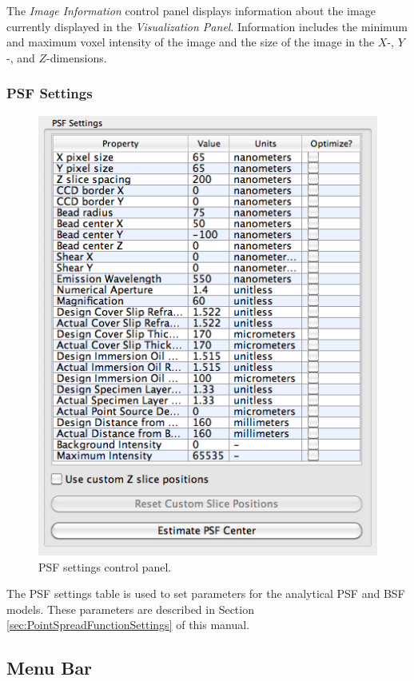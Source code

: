 \documentclass[11pt,titlepage,twoside]{article}
\begin{document}
The \emph{Image Information} control panel displays information about the image currently displayed in the \emph{Visualization Panel}. Information includes the minimum and maximum voxel intensity of the image and the size of the image in the $X$-, $Y$-, and $Z$-dimensions.

\subsubsection{PSF Settings}

\begin{figure}[h]
  \centering
  \includegraphics[scale=0.5]{images/PSFSettingsControlPanel}
  \caption{PSF settings control panel.}
  \label{fig:PSFSettingsControlPanel}
\end{figure}

The PSF settings table is used to set parameters for the analytical PSF and BSF models. These parameters are described in Section \ref{sec:PointSpreadFunctionSettings} of this manual.

\subsection{Menu Bar}
\end{document}
